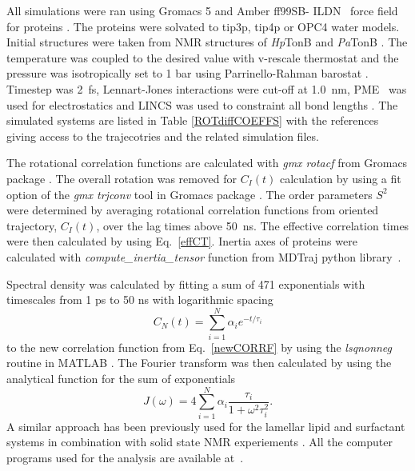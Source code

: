 \documentclass[pre,aps,floatfix,authordate1-4,twocolumn]{revtex4-1}
\begin{document}
All simulations were ran using Gromacs 5 \cite{abraham15}
and Amber ff99SB- ILDN~\cite{lindorff10} force field for proteins . The proteins were solvated
to tip3p\cite{jorgensen83}, tip4p \cite{jorgensen83} or OPC4 \cite{izadi14} water models.
Initial structures were taken from NMR structures of {\it Hp}TonB \cite{ciragan16} and
{\it Pa}TonB \cite{??}.
The temperature was coupled to the desired value with v-rescale thermostat \cite{bussi07} and the pressure was 
isotropically set to 1 bar using Parrinello-Rahman barostat \cite{parrinello81}.
Timestep was 2~fs, Lennart-Jones interactions were cut-off at 1.0~nm,
PME~\cite{darden93,essman95} was used for electrostatics and LINCS was used
to constraint all bond lengths \cite{hess07}. The simulated systems are listed
in Table \ref{ROTdiffCOEFFS} with the references giving access to the trajecotries
and the related simulation files.


The rotational correlation functions are calculated with {\it gmx rotacf} from
Gromacs package \cite{gromacsMANUAL}. The overall rotation was removed
for $C_I(t)$ calculation by using a fit option of the {\it gmx trjconv} tool
in Gromacs package \cite{gromacsMANUAL}. The order parameters $S^2$
were determined by averaging rotational correlation functions from
oriented trajectory, $C_I(t)$, over the lag times above 50~ns.
The effective correlation times were then calculated by using Eq.~\ref{effCT}. 
Inertia axes of proteins were calculated with {\it compute\_inertia\_tensor}
function from MDTraj python library~\cite{McGibbon2015MDTraj}.

Spectral density was calculated by fitting a
sum of 471 exponentials with timescales from 1 ps to 50 ns
with logarithmic spacing
\begin{equation}\label{gprime_fit}
C_N(t)=\sum_{i=1}^{N}\alpha_i e^{-t/\tau_i}
\end{equation}
to the new correlation function from Eq.~\ref{newCORRF}
by using the {\it lsqnonneg} routine in MATLAB \cite{matlab}.
The Fourier transform was then calculated by using the analytical function
for the sum of exponentials 
\begin{equation}\label{FTanal}
J(\omega) =  4 \sum_{i=1}^{N}\alpha_i\frac{\tau_i}{1+\omega^2\tau_i^2}.
\end{equation}
A similar approach has been previously used for the lamellar lipid and surfactant
systems in combination with solid state NMR experiements \cite{nowacka13,ferreira15}.
All the computer programs used for the analysis are available at~\cite{??}.
\end{document}
